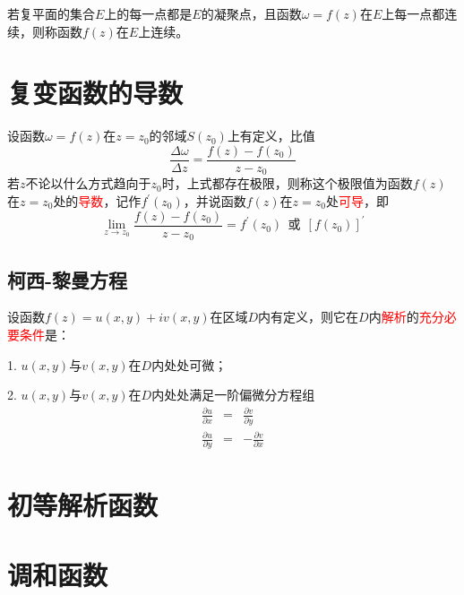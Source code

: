 \documentclass[12pt,a4paper]{article}
\begin{document}
若复平面的集合$E$上的每一点都是$E$的凝聚点，且函数$\omega = f(z)$在$E$上每一点都连续，则称函数$f(z)$在$E$上连续。




\section{复变函数的导数}
设函数$\omega = f(z)$在$z=z_0$的邻域$S(z_0)$上有定义，比值
\begin{equation}
\frac{\Delta \omega}{\Delta z} = \frac{f(z) -f(z_0)}{z -z_0}
\end{equation}
若$z$不论以什么方式趋向于$z_0$时，上式都存在极限，则称这个极限值为函数$f(z)$在$z=z_0$处的\textcolor{red}{导数}，记作$f^{\prime}(z_0)$，并说函数$f(z)$在$z=z_0$处\textcolor{red}{可导}，即
\begin{equation}
\underset{z \rightarrow z_0}{\lim} \frac{f(z) -f(z_0)}{z-z_0} = f^{\prime} (z_0) ~~\text{或} ~~ [f(z_0)]^{\prime}
\end{equation}


\subsection{柯西-黎曼方程}


设函数$f(z) = u(x, y) +iv(x, y)$在区域$D$内有定义，则它在$D$内\textcolor{red}{解析}的\textcolor{red}{充分必要条件}是：

1. $u(x, y)$与$v(x, y)$在$D$内处处可微；

2. $u(x, y)$与$v(x, y)$在$D$内处处满足一阶偏微分方程组
\begin{eqnarray}
\frac{\partial u}{\partial x} &=& \frac{\partial v}{\partial y} \\
\frac{\partial u}{\partial y} &=& -\frac{\partial v}{\partial x}
\end{eqnarray}




\section{初等解析函数}







\section{调和函数}
\end{document}
